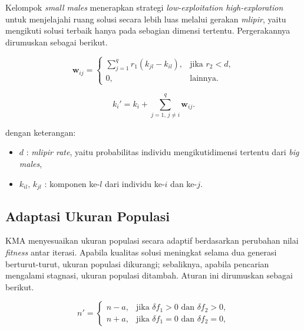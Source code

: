     Kelompok \textit{small males} menerapkan strategi \textit{low-exploitation high-exploration} untuk menjelajahi ruang solusi secara lebih luas melalui   gerakan \textit{mlipir}, yaitu mengikuti solusi terbaik hanya pada sebagian dimensi tertentu. Pergerakannya dirumuskan sebagai berikut.

    \begin{equation}
        \label{eq:smallmale-w}
        \mathbf{w}_{ij} =
        \begin{cases}
        \displaystyle\sum_{j=1}^{q} r_1(k_{jl} - k_{il}), & \text{jika } r_2 < d,\\[6pt] 
        0, & \text{lainnya.}
        \end{cases}
    \end{equation}

    \begin{equation}
        \label{eq:smallmale-k}
        k_i' = k_i + \sum_{j=1,\,j\neq i}^{q} \mathbf{w}_{ij}.
    \end{equation}

    dengan keterangan:
    \begin{itemize}
        \item $d$ : \textit{mlipir rate}, yaitu probabilitas individu mengikutidimensi tertentu dari \textit{big males},
        \item $k_{il},\,k_{jl}$ : komponen ke-$l$ dari individu ke-$i$ dan ke-$j$.
    \end{itemize}


    \subsection{Adaptasi Ukuran Populasi}\label{sub:adaptasi}
    KMA menyesuaikan ukuran populasi secara adaptif berdasarkan perubahan nilai \textit{fitness} antar iterasi. Apabila kualitas solusi meningkat selama dua generasi berturut-turut, ukuran populasi dikurangi; sebaliknya, apabila pencarian mengalami stagnasi, ukuran populasi ditambah. Aturan ini dirumuskan sebagai berikut.

    \begin{equation}
        \label{eq:adaptasi}
        n' =
        \begin{cases}
        n - a, & \text{jika } \delta f_1 > 0 \text{ dan } \delta f_2 > 0,\\
        n + a, & \text{jika } \delta f_1 = 0 \text{ dan } \delta f_2 = 0,
        \end{cases}
    \end{equation}

